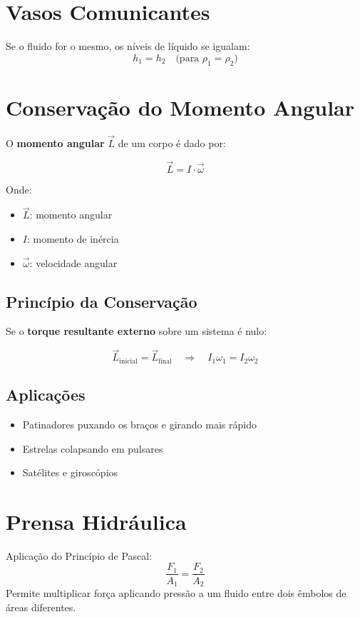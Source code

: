 \documentclass[a4paper,12pt]{article}
\begin{document}
\begin{multicols}{2}
\section{Vasos Comunicantes}
Se o fluido for o mesmo, os níveis de líquido se igualam:
\[
h_1 = h_2
\quad \text{(para } \rho_1 = \rho_2)
\]

\section{Conservação do Momento Angular}

O \textbf{momento angular} \( \vec{L} \) de um corpo é dado por:

\[
\vec{L} = I \cdot \vec{\omega}
\]

Onde:
\begin{itemize}
  \item \( \vec{L} \): momento angular
  \item \( I \): momento de inércia
  \item \( \vec{\omega} \): velocidade angular
\end{itemize}

\subsection{Princípio da Conservação}

Se o \textbf{torque resultante externo} sobre um sistema é nulo:

\[
\vec{L}_{\text{inicial}} = \vec{L}_{\text{final}}
\quad \Rightarrow \quad I_1 \omega_1 = I_2 \omega_2
\]

\subsection{Aplicações}

\begin{itemize}
  \item Patinadores puxando os braços e girando mais rápido
  \item Estrelas colapsando em pulsares
  \item Satélites e giroscópios
\end{itemize}
\section{Prensa Hidráulica}
Aplicação do Princípio de Pascal:
\[
\frac{F_1}{A_1} = \frac{F_2}{A_2}
\]
Permite multiplicar força aplicando pressão a um fluido entre dois êmbolos de áreas diferentes.


\end{multicols}
\end{document}
